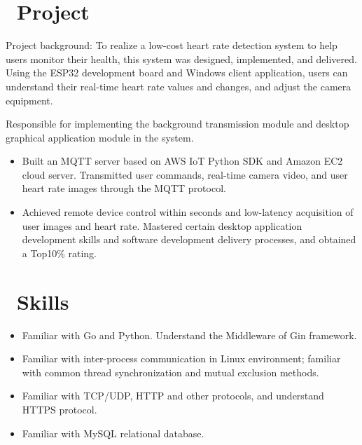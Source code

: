 \documentclass{resume}
\begin{document}
\section{\faTerminal\ Project}
\begin{onehalfspacing}
Project background: To realize a low-cost heart rate detection system to help users monitor their health, this system was designed, implemented, and delivered. Using the ESP32 development board and Windows client application, users can understand their real-time heart rate values and changes, and adjust the camera equipment.

Responsible for implementing the background transmission module and desktop graphical application module in the system.
\begin{itemize}
  \item Built an MQTT server based on AWS IoT Python SDK and Amazon EC2 cloud server. Transmitted user commands, real-time camera video, and user heart rate images through the MQTT protocol.
  \item Achieved remote device control within seconds and low-latency acquisition of user images and heart rate. Mastered certain desktop application development skills and software development delivery processes, and obtained a Top10\% rating.
\end{itemize}
\end{onehalfspacing}


\section{\faCogs\ Skills}
\begin{itemize}[parsep=0.5ex]
  \item Familiar with Go and Python. Understand the Middleware of Gin framework.
  \item Familiar with inter-process communication in Linux environment; familiar with common thread synchronization and mutual exclusion methods.
  \item Familiar with TCP/UDP, HTTP and other protocols, and understand HTTPS protocol.
  \item Familiar with MySQL relational database.
\end{itemize}
\end{document}
